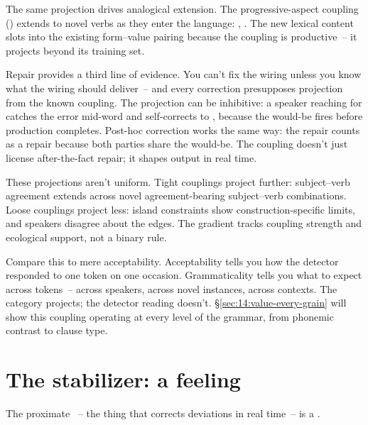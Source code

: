 The same projection drives analogical extension. The progressive-aspect coupling () extends to novel verbs as they enter the language: , . The new lexical content slots into the existing form--value pairing because the coupling is productive~-- it projects beyond its training set.

Repair provides a third line of evidence. You can't fix the wiring unless you know what the wiring should deliver~-- and every correction presupposes projection from the known coupling. The projection can be inhibitive: a speaker reaching for  catches the error mid-word and self-corrects to , because the would-be fires before production completes. Post-hoc correction works the same way: the repair counts as a repair because both parties share the would-be. The coupling doesn't just license after-the-fact repair; it shapes output in real time.

These projections aren't uniform. Tight couplings project further: subject--verb agreement extends across novel agreement-bearing subject--verb combinations. Loose couplings project less: island constraints show construction-specific limits, and speakers disagree about the edges. The gradient tracks coupling strength and ecological support, not a binary rule.

Compare this to mere acceptability. Acceptability tells you how the detector responded to one token on one occasion. Grammaticality tells you what to expect across tokens~-- across speakers, across novel instances, across contexts. The category projects; the detector reading doesn't. §\ref{sec:14:value-every-grain} will show this coupling operating at every level of the grammar, from phonemic contrast to clause type.


\section{The stabilizer: a feeling}
\label{sec:14:stabilizer}

The proximate ~-- the thing that corrects deviations in real time~-- is a .

